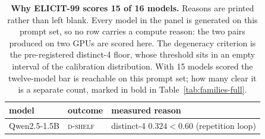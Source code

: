 \begin{table}[tb]
\centering\small
\caption{\textbf{Why ELICIT-99 scores 15 of 16 models.} Reasons are printed rather than left blank. Every model in the panel is generated on this prompt set, so no row carries a compute reason: the two pairs produced on two GPUs are scored here. The degeneracy criterion is the pre-registered distinct-4 floor, whose threshold sits in an empty interval of the calibration distribution. With 15 models scored the twelve-model bar is reachable on this prompt set; how many clear it is a separate count, marked in bold in Table~\ref{tab:families-full}.}
\label{tab:coverage}
\begin{tabular}{lll}
\toprule
model & outcome & measured reason \\
\midrule
Qwen2.5-1.5B & \textsc{d-shelf} & distinct-4 $0.324 < 0.60$ (repetition loop) \\
\bottomrule
\end{tabular}
\end{table}
